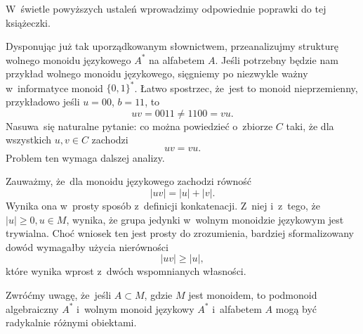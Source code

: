 \documentclass[a4paper,11pt]{article}
\begin{document}
W~świetle powyższych ustaleń wprowadzimy odpowiednie poprawki do tej
książeczki.

\vspace{\spaceFour}



\start {} Dysponując już tak uporządkowanym słownictwem,
przeanalizujmy strukturę wolnego monoidu językowego $A^{ * }$ na
alfabetem $A$. Jeśli potrzebny będzie nam przykład wolnego monoidu
językowego, sięgniemy po niezwykle ważny w~informatyce monoid
$\{ 0, 1 \}^{ * }$. Łatwo spostrzec, że~jest to monoid nieprzemienny,
przykładowo jeśli $u = 00$, $b = 11$, to
\begin{equation}
  \label{eq:Forys-Forys-05}
  u v = 0011 \neq 1100 = vu.
\end{equation}
Nasuwa~się naturalne pytanie: co można powiedzieć o~zbiorze $C$ taki,
że dla wszystkich $u, v \in C$ zachodzi
\begin{equation}
  \label{eq:Forys-Forys-06}
  uv = vu.
\end{equation}
Problem ten wymaga dalszej analizy.

Zauważmy, że~dla monoidu językowego zachodzi równość
\begin{equation}
  \label{eq:Forys-Forys-07}
  | u v | = | u | + | v |.
\end{equation}
Wynika ona w~prosty sposób z~definicji konkatenacji. Z~niej i~z~tego,
że~$| u | \geq 0, u \in M$, wynika, że grupa jedynki w~wolnym
monoidzie językowym jest trywialna. Choć wniosek ten jest prosty do
zrozumienia, bardziej sformalizowany dowód wymagałby użycia
nierówności
\begin{equation}
  \label{eq:Forys-Forys-08}
  | u v | \geq | u |,
\end{equation}
które wynika wprost z~dwóch wspomnianych własności.

\vspace{\spaceFour}



 Zwróćmy uwagę, że~jeśli $A \subset M$, gdzie $M$ jest monoidem, to
podmonoid algebraiczny $A^{ * }$ i~wolnym monoid językowy $A^{ * }$
i~alfabetem $A$ mogą być radykalnie różnymi obiektami.
\end{document}
